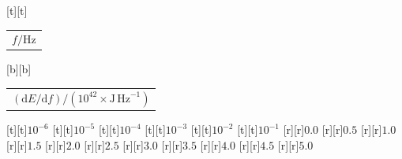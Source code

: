 %    
%
%
\begin{psfrags}%
\psfragscanon%
%
[t][t]{\color[rgb]{0,0,0}\setlength{\tabcolsep}{0pt}\begin{tabular}{c}{\Large$f/\mathrm{Hz}$}\end{tabular}}%
[b][b]{\color[rgb]{0,0,0}\setlength{\tabcolsep}{0pt}\begin{tabular}{c}{\Large$(\mathrm{d}E/\mathrm{d}{f})/\left(10^{42} \times \mathrm{J\,Hz}^{-1}\right)$}\end{tabular}}%
%
[t][t]{$10^{-6}$}%
[t][t]{$10^{-5}$}%
[t][t]{$10^{-4}$}%
[t][t]{$10^{-3}$}%
[t][t]{$10^{-2}$}%
[t][t]{$10^{-1}$}%
%
[r][r]{$0.0$}%
[r][r]{$0.5$}%
[r][r]{$1.0$}%
[r][r]{$1.5$}%
[r][r]{$2.0$}%
[r][r]{$2.5$}%
[r][r]{$3.0$}%
[r][r]{$3.5$}%
[r][r]{$4.0$}%
[r][r]{$4.5$}%
[r][r]{$5.0$}%
%
%
\end{psfrags}%
%
